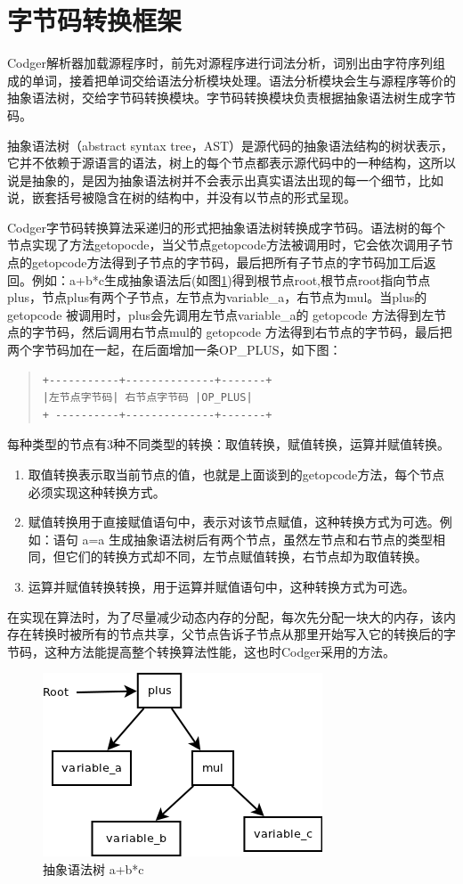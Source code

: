 \section{字节码转换框架}
Codger解析器加载源程序时，前先对源程序进行词法分析，词别出由字符序列组成的单词，接着把单词交给语法分析模块处理。语法分析模块会生与源程序等价的抽象语法树，交给字节码转换模块。字节码转换模块负责根据抽象语法树生成字节码。

抽象语法树（abstract syntax tree，AST）是源代码的抽象语法结构的树状表示，它并不依赖于源语言的语法，树上的每个节点都表示源代码中的一种结构，这所以说是抽象的，是因为抽象语法树并不会表示出真实语法出现的每一个细节，比如说，嵌套括号被隐含在树的结构中，并没有以节点的形式呈现。

Codger字节码转换算法采递归的形式把抽象语法树转换成字节码。语法树的每个节点实现了方法getopocde，当父节点getopcode方法被调用时，它会依次调用子节点的getopcode方法得到子节点的字节码，最后把所有子节点的字节码加工后返回。例如：a+b*c生成抽象语法后(如图\ref{fig:abs_tree2})得到根节点root,根节点root指向节点plus，节点plus有两个子节点，左节点为variable\_a，右节点为mul。当plus的 getopcode 被调用时，plus会先调用左节点variable\_a的 getopcode 方法得到左节点的字节码，然后调用右节点mul的 getopcode 方法得到右节点的字节码，最后把两个字节码加在一起，在后面增加一条OP\_PLUS，如下图：
\begin{quote}
\begin{verbatim}
+-----------+--------------+-------+
|左节点字节码| 右节点字节码 |OP_PLUS|
+ ----------+--------------+-------+
\end{verbatim}
\end{quote}
每种类型的节点有3种不同类型的转换：取值转换，赋值转换，运算并赋值转换。
\begin{enumerate}
\item 取值转换表示取当前节点的值，也就是上面谈到的getopcode方法，每个节点必须实现这种转换方式。
\item 赋值转换用于直接赋值语句中，表示对该节点赋值，这种转换方式为可选。例如：语句 a=a 生成抽象语法树后有两个节点，虽然左节点和右节点的类型相同，但它们的转换方式却不同，左节点赋值转换，右节点却为取值转换。
\item 运算并赋值转换转换，用于运算并赋值语句中，这种转换方式为可选。
\end{enumerate}
在实现在算法时，为了尽量减少动态内存的分配，每次先分配一块大的内存，该内存在转换时被所有的节点共享，父节点告诉子节点从那里开始写入它的转换后的字节码，这种方法能提高整个转换算法性能，这也时Codger采用的方法。
\begin{figure}
 \centering
 \includegraphics[scale=1]{abs_tree2.png}
 \caption{抽象语法树 a+b*c}
 \label{fig:abs_tree2}
\end{figure}

